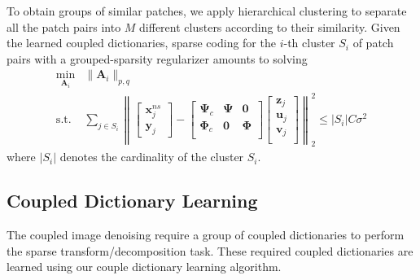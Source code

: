 \documentclass{article}
\begin{document}
To obtain groups of similar patches, we apply hierarchical clustering to separate all the patch pairs into $M$ different clusters according to their similarity. 
Given the learned coupled dictionaries, sparse coding for the $i$-th cluster $S_i$ of patch pairs with a grouped-sparsity regularizer amounts to solving
\begin{equation} \label{Eq:BPDN_GroupSparsity}
\begin{array}{cl}
\underset{\mathbf{A}_i}{\min}
& \! \! \! \!
\| \mathbf{A}_i \|_{p,q} \;
\\
\text{s.t.} 
& \! \! \! \!
\sum\limits_{j \in S_i} 
\left\|
\begin{bmatrix} 
\mathbf{x}^{ns}_{j} \\ \mathbf{y}_{j}
\end{bmatrix}
-
\begin{bmatrix}
\boldsymbol{\Psi}_{c} & \boldsymbol{\Psi} & \mathbf{0} \\
\boldsymbol{\Phi}_{c} & \mathbf{0} & \boldsymbol{\Phi} \\
\end{bmatrix}
\begin{bmatrix}
\mathbf{z}_j \\
\mathbf{u}_j \\
\mathbf{v}_j \\
\end{bmatrix}
\right\|_2^2
\leq
|S_i| C \sigma^2  
\end{array}
\end{equation}
where $|S_i|$ denotes the cardinality of the cluster $S_i$.

\vspace{-0.2cm}

\subsection{Coupled Dictionary Learning}


The coupled image denoising require a group of coupled dictionaries to perform the sparse transform/decomposition task. 
These required coupled dictionaries are learned using our couple dictionary learning algorithm.
\end{document}
